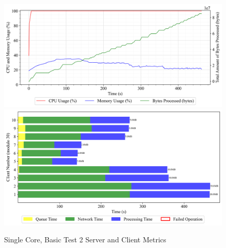 \begin{figure}[h!t]
    \begin{center}
    \label{Fig:A1.2}
    \caption{Single Core, Basic Test 2 Server and Client Metrics}
    \includegraphics[width=\x\textwidth]{Chapter4/Results/1c_results/arty-a7-1c_basic_2_20241004_111711.db_server_metrics.png}
    \includegraphics[width=\x\textwidth]{Chapter4/Results/1c_results/arty-a7-1c_basic_2_20241004_111711.db_client_tasks.png}
    \end{center}
\end{figure}

